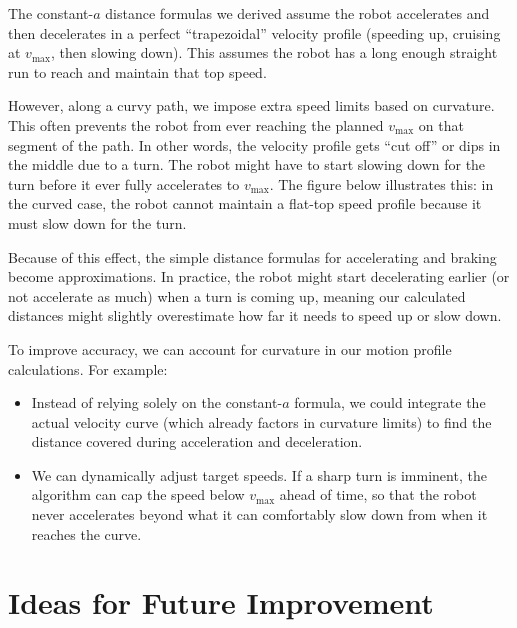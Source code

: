 \documentclass[11pt]{article}
\begin{document}
The constant-$a$ distance formulas we derived assume the robot accelerates and then decelerates in a perfect “trapezoidal” velocity profile (speeding up, cruising at $v_{\max}$, then slowing down). This assumes the robot has a long enough straight run to reach and maintain that top speed.

However, along a curvy path, we impose extra speed limits based on curvature. This often prevents the robot from ever reaching the planned $v_{\max}$ on that segment of the path. In other words, the velocity profile gets “cut off” or dips in the middle due to a turn. The robot might have to start slowing down for the turn before it ever fully accelerates to $v_{\max}$. The figure below illustrates this: in the curved case, the robot cannot maintain a flat-top speed profile because it must slow down for the turn.


Because of this effect, the simple distance formulas for accelerating and braking become approximations. In practice, the robot might start decelerating earlier (or not accelerate as much) when a turn is coming up, meaning our calculated distances might slightly overestimate how far it needs to speed up or slow down.

To improve accuracy, we can account for curvature in our motion profile calculations. For example:
\begin{itemize}
  \item Instead of relying solely on the constant-$a$ formula, we could integrate the actual velocity curve (which already factors in curvature limits) to find the distance covered during acceleration and deceleration.
  \item We can dynamically adjust target speeds. If a sharp turn is imminent, the algorithm can cap the speed below $v_{\max}$ ahead of time, so that the robot never accelerates beyond what it can comfortably slow down from when it reaches the curve.
\end{itemize}

\section{Ideas for Future Improvement}
\end{document}
